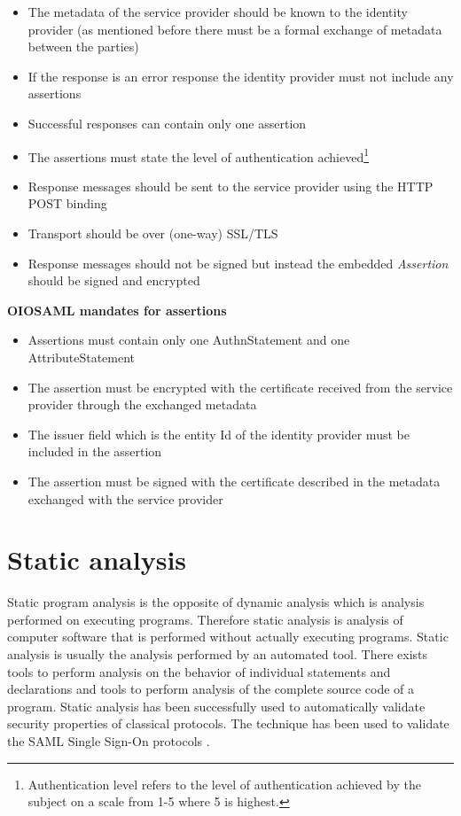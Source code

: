 \documentclass[twosided]{report}
\begin{document}
\begin{itemize}
  \item The metadata of the service provider should be known to the identity provider (as mentioned before there must be a formal exchange of metadata between the parties)
  \item If the response is an error response the identity provider must not include any assertions
  \item Successful responses can contain only one assertion
  \item The assertions must state the level of authentication achieved\footnote{Authentication level refers to the level of authentication achieved by the subject on a scale from 1-5 where 5 is highest.}
  \item Response messages should be sent to the service provider using the HTTP POST binding
  \item Transport should be over (one-way) SSL/TLS
  \item Response messages should not be signed but instead the embedded \emph{Assertion} should be signed and encrypted
\end{itemize}
\textbf{OIOSAML mandates for assertions}
\begin{itemize}
  \item Assertions must contain only one AuthnStatement and one AttributeStatement
  \item The assertion must be encrypted with the certificate received from the service provider through the exchanged metadata
  \item The issuer field which is the entity Id of the identity provider must be included in the assertion
  \item The assertion must be signed with the certificate described in the metadata exchanged with the service provider
\end{itemize}
\section{Static analysis}
Static program analysis is the opposite of dynamic analysis which is analysis performed on executing programs. Therefore static analysis is analysis of computer software that is performed without actually executing programs. Static analysis is usually the analysis performed by an automated tool. There exists tools to perform analysis on the behavior of individual statements and declarations and tools to perform analysis of the complete source code of a program. Static analysis has been successfully used to automatically validate security properties of classical protocols. The technique has been used to validate the SAML Single Sign-On protocols \cite{HansenSkriver}.
\end{document}

